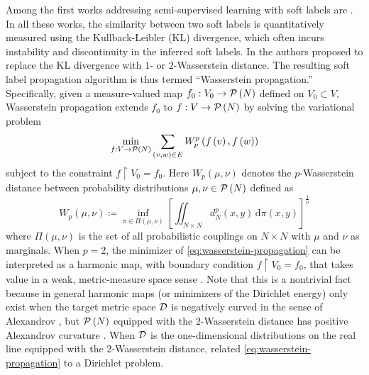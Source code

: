 \documentclass[letterpaper]{article} %
\begin{document}
Among the first works addressing semi-supervised learning with soft labels are \cite{Distribution_Propagation1,Distribution_Propagation2,SSL_Measure_Propagation}. In all these works, the similarity between two soft labels is quantitatively measured using the Kullback-Leibler (KL) divergence, which often incurs instability and discontinuity in the inferred soft labels. In \cite{Solomon:2014} the authors proposed to replace the KL divergence with $1$- or $2$-Wasserstein distance. The resulting soft label propagation algorithm is thus termed ``Wasserstein propagation.'' Specifically, given a measure-valued map $f_0:V_0\rightarrow\P \left( N \right)$ defined on $V_0\subset V$, Wasserstein propagation extends $f_0$ to $f:V\rightarrow \P \left( N \right)$ by solving the variational problem
\begin{equation}
  \label{eq:wasserstein-propagation}
  \min_{f:V\rightarrow\P \left( N \right)}\sum_{\left( v,w \right)\in E}W_p^p \left( f \left( v \right), f \left( w \right) \right)
\end{equation}
subject to the constraint $f\restriction V_0=f_0$. Here $W_p \left( \mu,\nu \right)$ denotes the $p$-Wasserstein distance between probability distributions $\mu,\nu\in\P \left( N \right)$ defined as
\begin{equation}
  \label{eq:wasserstein-distance}
  W_p \left( \mu,\nu \right)\coloneqq\inf_{\pi\in\Pi \left( \mu,\nu \right)}\left[\iint_{N\times N}d^p_N \left( x,y \right)\,\mathrm{d}\pi \left( x,y \right)\right]^{\frac{1}{p}}
\end{equation}
where $\Pi \left( \mu,\nu \right)$ is the set of all probabilistic couplings on $N\times N$ with $\mu$ and $\nu$ as marginals. When $p=2$, the minimizer of \eqref{eq:wasserstein-propagation} can be interpreted as a harmonic map, with boundary condition $f\restriction V_0=f_0$, that takes value in a weak, metric-measure space sense \cite{Otto2001,ambrosio2005gradient,LottVillani2009,Dirichlet_Wasserstein}. Note that this is a nontrivial fact because in general harmonic maps (or minimizers of the Dirichlet energy) only exist when the target metric space $\D$ is negatively curved in the sense of Alexandrov \cite{Jost}, but $\P \left( N \right)$ equipped with the $2$-Wasserstein distance has positive Alexandrov curvature \cite[]{ambrosio2005gradient}. When $\D$ is the one-dimensional distributions on the real line equipped with the $2$-Wasserstein distance, \cite{Solomon:2014} related \eqref{eq:wasserstein-propagation} to a Dirichlet problem.
\end{document}
